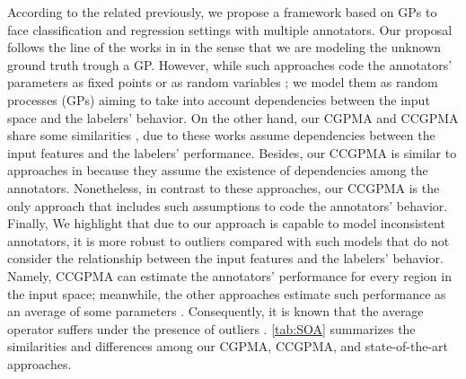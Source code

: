 \documentclass[journal]{IEEEtran}
\begin{document}
According to the related previously, we propose a framework based on GPs to face classification and regression settings with multiple annotators. Our proposal follows the line of the works in \cite{rodrigues2014gaussian,groot2011learning,ruiz2019learning,morales2019scalable,morales2019scalable1} in the sense that we are modeling the unknown ground truth trough a GP. However, while such approaches code the annotators' parameters as fixed points \cite{rodrigues2014gaussian,groot2011learning} or as random variables \cite{ruiz2019learning,morales2019scalable,morales2019scalable1}; we model them as random processes (GPs) aiming to take into account dependencies between the input space and the labelers' behavior. On the other hand, our CGPMA and CCGPMA share some similarities  \cite{yan2014learning,xiao2013learning}, due to these works assume dependencies between the input features and the labelers' performance. Besides, our CCGPMA is similar to approaches in \cite{zhu2019unsupervised,gil2018learning} because they assume the existence of dependencies among the annotators.
Nonetheless, in contrast to these approaches, our CCGPMA is the only approach that includes such assumptions to code the annotators' behavior. Finally, We highlight that due to our approach is capable to model inconsistent annotators, it is more robust to outliers compared with such models that do not consider the relationship between the input features and the labelers' behavior. Namely, CCGPMA can estimate the annotators' performance for every region in the input space; meanwhile, the other approaches estimate such performance as an average of some parameters \cite{rodrigues2017learning,morales2019scalable,ruiz2019learning}. Consequently, it is known that the average operator suffers under the presence of outliers \cite{kara2015modeling}. \cref{tab:SOA} summarizes the similarities and differences among our CGPMA, CCGPMA, and state-of-the-art approaches.
\end{document}
